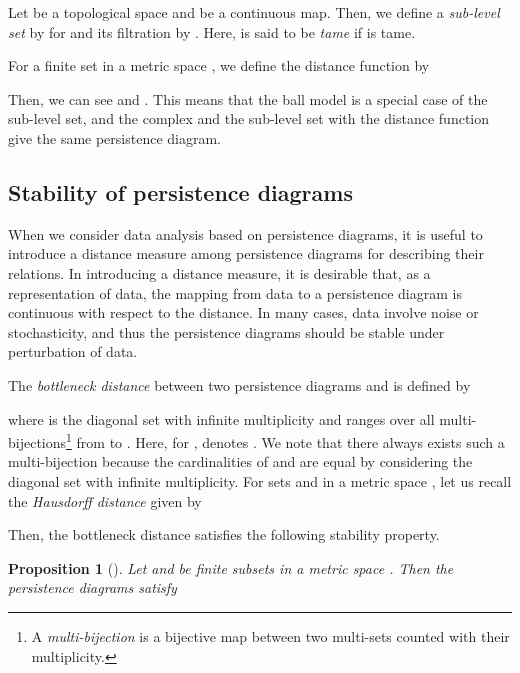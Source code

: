 \documentclass{article}
\newtheorem{prop}[thm]{Proposition}
\begin{document}
Let  be a topological space and  be a continuous map.
Then, we define a {\em sub-level set} by  for  and its filtration by .
Here,  is said to be {\em tame} if  is tame.

For a finite set  in a metric space , we define the distance function  by 

Then, we can see  and .
This means that the ball model is a special case of the sub-level set, and the  complex and the sub-level set with the distance function  give the same persistence diagram.
 
\subsection{Stability of persistence diagrams}
\label{sec:bottleneck_stability}

When we consider data analysis based on persistence diagrams, it is useful to introduce a distance measure among persistence diagrams for describing their relations.
In introducing a distance measure, it is desirable that, as a representation of data, the mapping from data to a persistence diagram is continuous with respect to the distance.
In many cases, data involve noise or stochasticity, and thus the persistence diagrams should be stable under perturbation of data.

The {\em bottleneck distance}  between two persistence diagrams  and  is defined by

where  is the diagonal set with infinite multiplicity and  ranges over all multi-bijections\footnote{A {\em multi-bijection} is a bijective map between two multi-sets counted with their multiplicity.} from  to .
Here, for ,  denotes . 
We note that there always exists such a multi-bijection  because the cardinalities of  and  are equal by considering the diagonal set  with infinite multiplicity.
For sets  and  in a metric space , let us recall the {\em Hausdorff distance}  given by

Then, the bottleneck distance satisfies the following stability property.
\begin{prop}[\cite{CdSO14,CEH07}]
\label{prop:point_stability}
Let  and  be finite subsets in a metric space .
Then the persistence diagrams satisfy

\end{prop}
\end{document}
